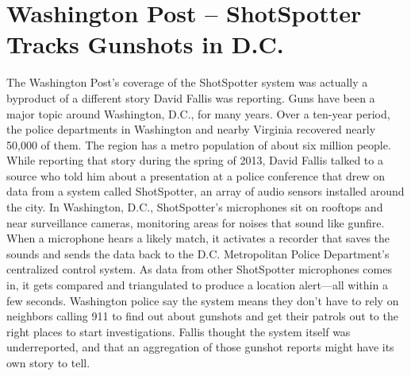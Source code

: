 \section{Washington Post – ShotSpotter Tracks Gunshots in D.C.}
The Washington Post's coverage of the ShotSpotter system was actually a
byproduct of a different story David Fallis was reporting. Guns have been
a major topic around Washington, D.C., for many years. Over a ten-year
period, the police departments in Washington and nearby Virginia recovered
nearly 50,000 of them. The region has a metro population of about
six million people. While reporting that story during the spring of 2013,
David Fallis talked to a source who told him about a presentation at a police
conference that drew on data from a system called ShotSpotter, an array of
audio sensors installed around the city.
In Washington, D.C., ShotSpotter's microphones sit on rooftops and near
surveillance cameras, monitoring areas for noises that sound like gunfire.
When a microphone hears a likely match, it activates a recorder that saves
the sounds and sends the data back to the D.C. Metropolitan Police Department's
centralized control system. As data from other ShotSpotter microphones
comes in, it gets compared and triangulated to produce a location
alert—all within a few seconds. Washington police say the system means
they don't have to rely on neighbors calling 911 to find out about gunshots
and get their patrols out to the right places to start investigations. Fallis
thought the system itself was underreported, and that an aggregation of
those gunshot reports might have its own story to tell.

